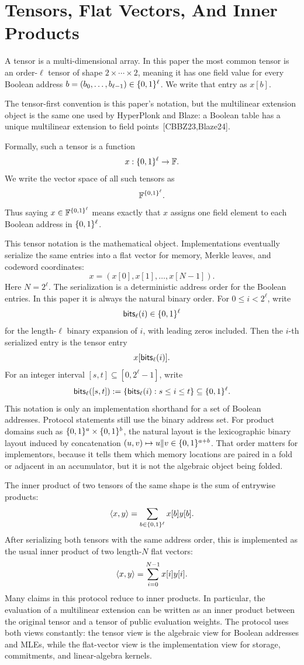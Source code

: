 \section{Tensors, Flat Vectors, And Inner Products}

A tensor is a multi-dimensional array.  In this paper the most common tensor is
an order-$\ell$ tensor of shape $2\times\cdots\times2$, meaning it has one field
value for every Boolean address $b=(b_0,\ldots,b_{\ell-1})\in\{0,1\}^\ell$.  We write
that entry as $x[b]$.

The tensor-first convention is this paper's notation, but the multilinear
extension object is the same one used by HyperPlonk and Blaze: a Boolean table
has a unique multilinear extension to field points~[CBBZ23,Blaze24].

Formally, such a tensor is a function
\[
  x:\{0,1\}^\ell\to\mathbb{F}.
\]
We write the vector space of all such tensors as
\[
  \mathbb{F}^{\{0,1\}^\ell}.
\]
Thus saying $x\in\mathbb{F}^{\{0,1\}^\ell}$ means exactly that $x$ assigns one field element
to each Boolean address in $\{0,1\}^\ell$.

This tensor notation is the mathematical object.  Implementations eventually
serialize the same entries into a flat vector for memory, Merkle leaves, and
codeword coordinates:
\[
  x=(x[0],x[1],\ldots,x[N-1]).
\]
Here $N=2^\ell$.  The serialization is a deterministic address order for the
Boolean entries.  In this paper it is always the natural binary order.  For
\(0\le i<2^\ell\), write
\[
  \mathsf{bits}_\ell(i)\in\{0,1\}^\ell
\]
for the length-\(\ell\) binary expansion of \(i\), with leading zeros included.
Then the \(i\)-th serialized entry is the tensor entry
\[
  x[\mathsf{bits}_\ell(i)].
\]
For an integer interval \([s,t]\subseteq[0,2^\ell-1]\), write
\[
  \mathsf{bits}_\ell([s,t])
  :=
  \{\mathsf{bits}_\ell(i):s\le i\le t\}\subseteq\{0,1\}^\ell.
\]
This notation is only an implementation shorthand for a set of Boolean
addresses.  Protocol statements still use the binary address set.  For product
domains such as \(\{0,1\}^a\times\{0,1\}^b\), the natural layout is the lexicographic
binary layout induced by concatenation \((u,v)\mapsto u\Vert v\in\{0,1\}^{a+b}\).
That order matters for implementors, because it tells them which memory
locations are paired in a fold or adjacent in an accumulator, but it is not the
algebraic object being folded.

The inner product of two tensors of the same shape is the sum of entrywise
products:
\[
  \left\langle x,y \right\rangle=\sum_{b\in\{0,1\}^\ell} x[b]y[b].
\]
After serializing both tensors with the same address order, this is implemented
as the usual inner product of two length-$N$ flat vectors:
\[
  \left\langle x,y \right\rangle=\sum_{i=0}^{N-1} x[i]y[i].
\]
Many claims in this protocol reduce to inner products.  In particular, the
evaluation of a multilinear extension can be written as an inner product between
the original tensor and a tensor of public evaluation weights.  The protocol
uses both views constantly: the tensor view is the algebraic view for Boolean
addresses and MLEs, while the flat-vector view is the implementation view for
storage, commitments, and linear-algebra kernels.

